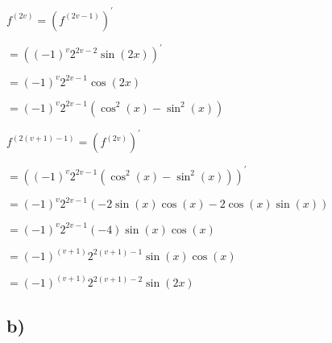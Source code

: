 $   f^{(2v)} = (f^{(2v-1)})^{\prime} $

$   = ((-1)^{v} 2^{2v-2} \sin(2x))^{\prime} $

$   = (-1)^{v} 2^{2v-1}\cos(2x) $

$   = (-1)^{v} 2^{2v-1}(\cos^{2}(x)-\sin^{2}(x)) $ \bigskip

$   f^{(2(v+1)-1)} = (f^{(2v)})^{\prime} $

$   = ((-1)^{v} 2^{2v-1}(\cos^{2}(x)-\sin^{2}(x)))^{\prime} $

$   = (-1)^{v} 2^{2v-1}(-2\sin(x)\cos(x)-2\cos(x)\sin(x)) $

$   = (-1)^{v} 2^{2v-1}(-4)\sin(x)\cos(x) $

$   = (-1)^{(v+1)} 2^{2(v+1)-1}\sin(x)\cos(x) $

$   = (-1)^{(v+1)} 2^{2(v+1)-2}\sin(2x) $


\subsection*{b)}
